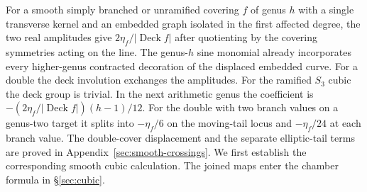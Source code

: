 For a smooth simply branched or unramified covering \(f\) of genus \(h\) with a single transverse kernel and an embedded graph isolated in the first affected degree, the two real amplitudes give \(2\eta_f/|\operatorname{Deck}f|\) after quotienting by the covering symmetries acting on the line. The genus-\(h\) sine monomial already incorporates every higher-genus contracted decoration of the displaced embedded curve. For a double the deck involution exchanges the amplitudes. For the ramified \(S_3\) cubic the deck group is trivial. In the next arithmetic genus the coefficient is \(-(2\eta_f/|\operatorname{Deck}f|)(h-1)/12\). For the double with two branch values on a genus-two target it splits into \(-\eta_f/6\) on the moving-tail locus and \(-\eta_f/24\) at each branch value.
The double-cover displacement and the separate elliptic-tail terms
are proved in Appendix~\ref{sec:smooth-crossings}. We first establish
the corresponding smooth cubic calculation. The joined maps enter
the chamber formula in \S\ref{sec:cubic}.
